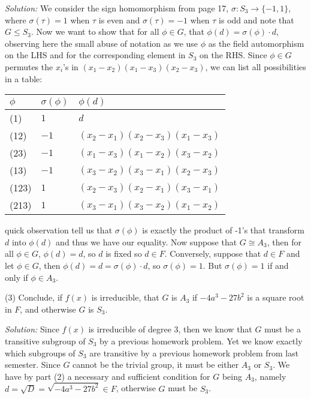 \documentclass{letter}
\newcommand{\tmem}[1]{{\em #1\/}}
\begin{document}
{\tmem{Solution:}} We consider the sign homomorphism from page 17, $\sigma :
S_3 \rightarrow \{- 1, 1\}$, where $\sigma (\tau) = 1$ when $\tau$ is even and
$\sigma (\tau) = - 1$ when $\tau$ is odd and note that $G \leq S_3$. Now we
want to show that for all $\phi \in G$, that $\phi (d) = \sigma (\phi) \cdot
d$, observing here the small abuse of notation as we use $\phi$ as the field
automorphism on the LHS and for the corresponding element in $S_3$ on the RHS.
Since $\phi \in G$ permutes the $x_i$'s in $(x_1 - x_2) (x_1 - x_3) (x_2 -
x_3)$, we can list all possibilities in a table:

\begin{tabular}{|l|l|l|}
  \hline
  $\phi$ & $\sigma (\phi)$ & $\phi (d)$\\
  \hline
  (1) & $1$ & $d$\\
  \hline
  (12) & $- 1$ & $(x_2 - x_1) (x_2 - x_3) (x_1 - x_3)$\\
  \hline
  (23) & $- 1$ & $(x_1 - x_3) (x_1 - x_2) (x_3 - x_2)$\\
  \hline
  (13) & $- 1$ & $(x_3 - x_2) (x_3 - x_1) (x_2 - x_3)$\\
  \hline
  (123) & $1$ & $(x_2 - x_3) (x_2 - x_1) (x_3 - x_1)$\\
  \hline
  (213) & $1$ & $(x_3 - x_1) (x_3 - x_2) (x_1 - x_2)$\\
  \hline
\end{tabular} quick observation tell us that $\sigma (\phi)$ is exactly the
product of -1's that transform $d$ into $\phi (d)$ and thus we have our
equality. Now suppose that $G \cong A_3$, then for all $\phi \in G$, $\phi (d)
= d$, so $d$ is fixed so $d \in F$. Conversely, suppose that $d \in F$ and let
$\phi \in G$, then $\phi (d) = d = \sigma (\phi) \cdot d$, so $\sigma (\phi) =
1$. But $\sigma (\phi) = 1$ if and only if $\phi \in A_3$.

(3) Conclude, if $f (x)$ is irreducible, that $G$ is $A_3$ if $- 4 a^3 - 27
b^2$ is a square root in $F$, and otherwise $G$ is $S_3$.

{\tmem{Solution:}} Since $f (x)$ is irreducible of degree 3, then we know that
$G$ must be a transitive subgroup of $S_3$ by a previous homework problem. Yet
we know exactly which subgroups of $S_3$ are transitive by a previous homework
problem from last semester. Since $G$ cannot be the trivial group, it must be
either $A_3$ or $S_3$. We have by part (2) a necessary and sufficient
condition for $G$ being $A_3$, namely $d = \sqrt{D} = \sqrt{- 4 a^3 - 27 b^2}
\in F$, otherwise $G$ must be $S_3$.
\end{document}
